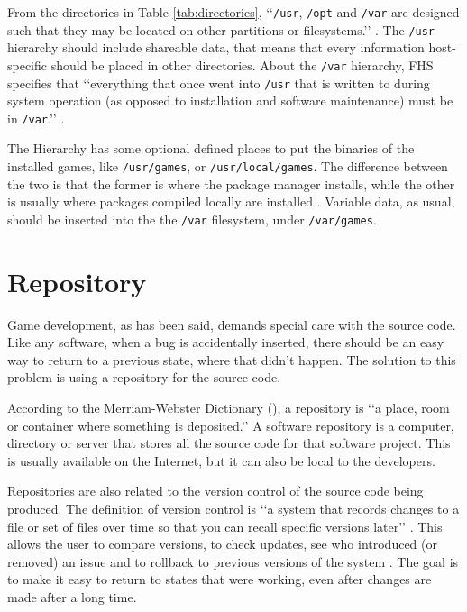 From the directories in Table \ref{tab:directories}, \lq\lq \texttt{/usr}, \texttt{/opt} and \texttt{/var} are designed such that they may be located on other partitions or filesystems.\rq\rq{} \cite{allbery2015filesystem}. The \texttt{/usr} hierarchy should include shareable data, that means that every information host-specific should be placed in other directories. About the \texttt{/var} hierarchy, FHS specifies that \lq\lq everything that once went into \texttt{/usr} that is written to during system operation (as opposed to installation and software maintenance) must be in \texttt{/var}.\rq\rq{} \cite{allbery2015filesystem}.

The Hierarchy has some optional defined places to put the binaries of the installed games, like \texttt{/usr/games}, or \texttt{/usr/local/games}. The difference between the two is that the former is where the package manager installs, while the other is usually where packages compiled locally are installed \cite{blfsdevelopmentteam2017}. Variable data, as usual, should be inserted into the the \texttt{/var} filesystem, under \texttt{/var/games}.


\section{Repository}
\label {sec:repository}

Game development, as has been said, demands special care with the source code. Like any software, when a bug is accidentally inserted, there should be an easy way to return to a previous state, where that didn't happen. The solution to this problem is using a repository for the source code.

According to the Merriam-Webster Dictionary (\citeyear{webster2017repository}), a repository is \lq\lq a place, room or container where something is deposited.\rq\rq{} A software repository is a computer, directory or server that stores all the source code for that software project. This is usually available on the Internet, but it can also be local to the developers.

Repositories are also related to the version control of the source code being produced. The definition of version control is \lq\lq a system that records changes to a file or set of files over time so that you can recall specific versions later\rq\rq{} \cite{loeliger2012version}. This allows the user to compare versions, to check updates, see who introduced (or removed) an issue and to rollback to previous versions of the system \cite{chacon2014pro}. The goal is to make it easy to return to states that were working, even after changes are made after a long time.

